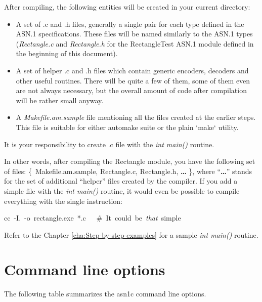 \documentclass[english,oneside,12pt]{book}
\newenvironment{lyxcode}
{\par\begin{list}{}{
\setlength{\rightmargin}{\leftmargin}
\setlength{\listparindent}{0pt}%
\raggedright
\setlength{\itemsep}{0pt}
\setlength{\parsep}{0pt}
\normalfont\ttfamily}%
 \item[]}
{\end{list}}
\begin{document}
After compiling, the following entities will be created in your current
directory:
\begin{itemize}
\item A set of .c and .h files, generally a single pair for each type defined
in the ASN.1 specifications. These files will be named similarly to
the ASN.1 types (\emph{Rectangle.c} and \emph{Rectangle.h} for the
RectangleTest ASN.1 module defined in the beginning of this document).
\item A set of helper .c and .h files which contain generic encoders, decoders
and other useful routines. There will be quite a few of them, some
of them even are not always necessary, but the overall amount of code
after compilation will be rather small anyway.
\item A \emph{Makefile.am.sample} file mentioning all the files created
at the earlier steps. This file is suitable for either automake suite
or the plain `make` utility.
\end{itemize}
It is your responsibility to create .c file with the \emph{int main()}
routine.

In other words, after compiling the Rectangle module, you have the
following set of files: \{~Makefile.am.sample, Rectangle.c, Rectangle.h,
\textbf{\ldots{}} \}, where ``\textbf{\ldots{}}'' stands for the
set of additional ``helper'' files created by the compiler. If you
add a simple file with the \emph{int main()} routine, it would even
be possible to compile everything with the single instruction:
\begin{lyxcode}
cc~-I.~-o~rectangle.exe~{*}.c~~~\#~It~could~be~\emph{that}~simple
\end{lyxcode}
Refer to the Chapter \vref{cha:Step-by-step-examples} for a sample
\emph{int main()} routine.


\section{\label{sec:Command-line-options}Command line options}

The following table summarizes the asn1c command line options.
\end{document}
